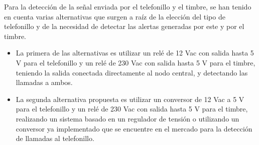     Para la detección de la señal enviada por el telefonillo y el timbre, se han tenido en cuenta varias alternativas que surgen a raíz de la elección del tipo de telefonillo y de la necesidad de detectar las alertas generadas por este y por el timbre.
    \begin{itemize}
        \item La primera de las alternativas es utilizar un relé de 12 Vac con salida hasta 5 V para el telefonillo y un relé de 230 Vac con salida hasta 5 V para el timbre, teniendo la salida conectada directamente al nodo central, y detectando las llamadas a ambos.
        \item La segunda alternativa propuesta es utilizar un conversor de 12 Vac a 5 V para el telefonillo y un relé de 230 Vac con salida hasta 5 V para el timbre, realizando un sistema basado en un regulador de tensión o utilizando un conversor ya implementado que se encuentre en el mercado para la detección de llamadas al telefonillo.
    \end{itemize}

